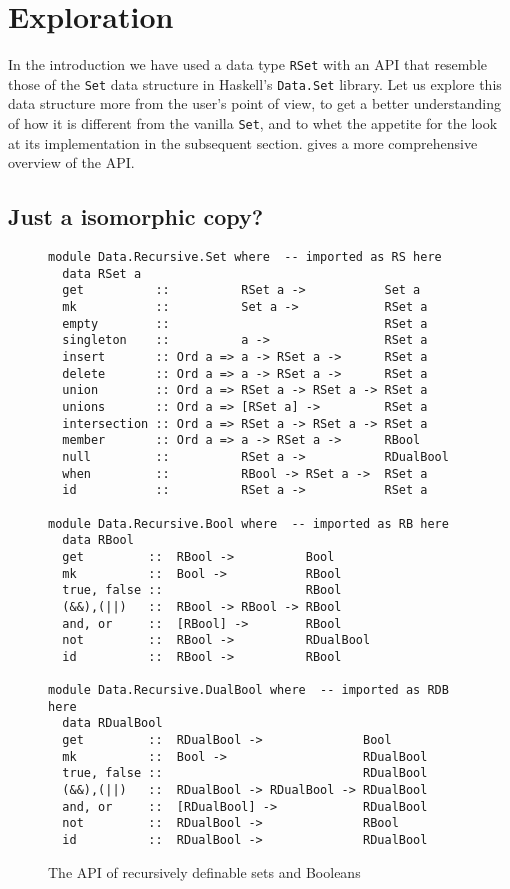 \documentclass[manuscript,screen,acmsmall]{acmart}
\begin{document}
\section{Exploration}\label{sec:exploration}

In the introduction we have used a data type \verb|RSet| with an API that resemble those of the \verb|Set| data structure in Haskell's \verb|Data.Set| library. Let us explore this data structure more from the user's point of view, to get a better understanding of how it is different from the vanilla \verb|Set|, and to whet the appetite for the look at its implementation in the subsequent section.
 gives a more comprehensive overview of the API.

\subsection{Just a isomorphic copy?}

\begin{figure}
\begin{verbatim}
module Data.Recursive.Set where  -- imported as RS here
  data RSet a
  get          ::          RSet a ->           Set a
  mk           ::          Set a ->            RSet a
  empty        ::                              RSet a
  singleton    ::          a ->                RSet a
  insert       :: Ord a => a -> RSet a ->      RSet a
  delete       :: Ord a => a -> RSet a ->      RSet a
  union        :: Ord a => RSet a -> RSet a -> RSet a
  unions       :: Ord a => [RSet a] ->         RSet a
  intersection :: Ord a => RSet a -> RSet a -> RSet a
  member       :: Ord a => a -> RSet a ->      RBool
  null         ::          RSet a ->           RDualBool
  when         ::          RBool -> RSet a ->  RSet a
  id           ::          RSet a ->           RSet a

module Data.Recursive.Bool where  -- imported as RB here
  data RBool
  get         ::  RBool ->          Bool
  mk          ::  Bool ->           RBool
  true, false ::                    RBool
  (&&),(||)   ::  RBool -> RBool -> RBool
  and, or     ::  [RBool] ->        RBool
  not         ::  RBool ->          RDualBool
  id          ::  RBool ->          RBool

module Data.Recursive.DualBool where  -- imported as RDB here
  data RDualBool
  get         ::  RDualBool ->              Bool
  mk          ::  Bool ->                   RDualBool
  true, false ::                            RDualBool
  (&&),(||)   ::  RDualBool -> RDualBool -> RDualBool
  and, or     ::  [RDualBool] ->            RDualBool
  not         ::  RDualBool ->              RBool
  id          ::  RDualBool ->              RDualBool
\end{verbatim}
\caption{The API of recursively definable sets and Booleans}\label{fig:api}
\end{figure}
\end{document}
